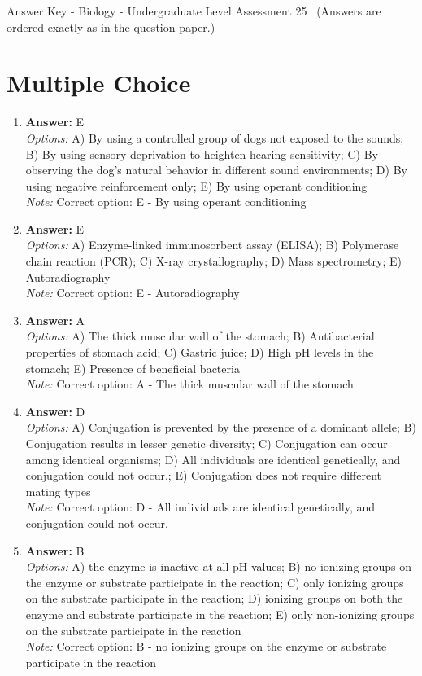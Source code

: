 \documentclass[12pt]{article}
\begin{document}
\begin{center}
Answer Key - Biology - Undergraduate Level Assessment 25 \
\small (Answers are ordered exactly as in the question paper.)
\end{center}

\section*{Multiple Choice}
\begin{enumerate}[label=\arabic*.]
\item \textbf{Answer:} E
\\ \textit{Options:} A) By using a controlled group of dogs not exposed to the sounds; B) By using sensory deprivation to heighten hearing sensitivity; C) By observing the dog's natural behavior in different sound environments; D) By using negative reinforcement only; E) By using operant conditioning
\\ \textit{Note:} Correct option: E - By using operant conditioning
\item \textbf{Answer:} E
\\ \textit{Options:} A) Enzyme-linked immunosorbent assay (ELISA); B) Polymerase chain reaction (PCR); C) X-ray crystallography; D) Mass spectrometry; E) Autoradiography
\\ \textit{Note:} Correct option: E - Autoradiography
\item \textbf{Answer:} A
\\ \textit{Options:} A) The thick muscular wall of the stomach; B) Antibacterial properties of stomach acid; C) Gastric juice; D) High pH levels in the stomach; E) Presence of beneficial bacteria
\\ \textit{Note:} Correct option: A - The thick muscular wall of the stomach
\item \textbf{Answer:} D
\\ \textit{Options:} A) Conjugation is prevented by the presence of a dominant allele; B) Conjugation results in lesser genetic diversity; C) Conjugation can occur among identical organisms; D) All individuals are identical genetically, and conjugation could not occur.; E) Conjugation does not require different mating types
\\ \textit{Note:} Correct option: D - All individuals are identical genetically, and conjugation could not occur.
\item \textbf{Answer:} B
\\ \textit{Options:} A) the enzyme is inactive at all pH values; B) no ionizing groups on the enzyme or substrate participate in the reaction; C) only ionizing groups on the substrate participate in the reaction; D) ionizing groups on both the enzyme and substrate participate in the reaction; E) only non-ionizing groups on the substrate participate in the reaction
\\ \textit{Note:} Correct option: B - no ionizing groups on the enzyme or substrate participate in the reaction
\end{enumerate}
\end{document}
